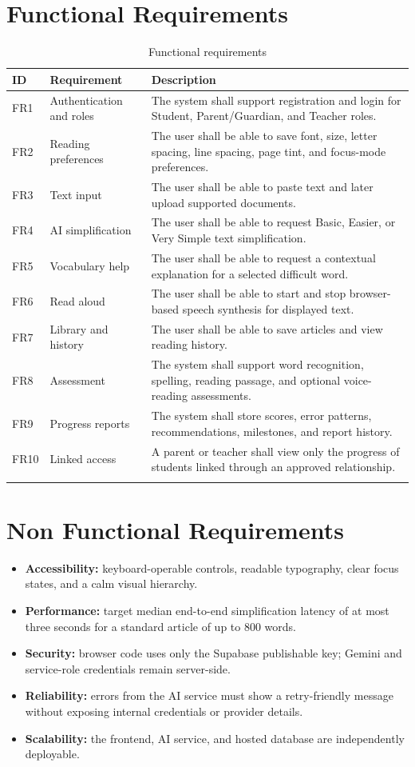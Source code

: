 \documentclass[a4paper]{tietreport}
\newcommand{\term}[1]{\textbf{#1}}
\begin{document}
\section{Functional Requirements}
\begin{longtable}{p{} p{} p{}}
\toprule
\textbf{ID} & \textbf{Requirement} & \textbf{Description} \\
\midrule
FR1 & Authentication and roles & The system shall support registration and login for Student, Parent/Guardian, and Teacher roles. \\
FR2 & Reading preferences & The user shall be able to save font, size, letter spacing, line spacing, page tint, and focus-mode preferences. \\
FR3 & Text input & The user shall be able to paste text and later upload supported documents. \\
FR4 & AI simplification & The user shall be able to request Basic, Easier, or Very Simple text simplification. \\
FR5 & Vocabulary help & The user shall be able to request a contextual explanation for a selected difficult word. \\
FR6 & Read aloud & The user shall be able to start and stop browser-based speech synthesis for displayed text. \\
FR7 & Library and history & The user shall be able to save articles and view reading history. \\
FR8 & Assessment & The system shall support word recognition, spelling, reading passage, and optional voice-reading assessments. \\
FR9 & Progress reports & The system shall store scores, error patterns, recommendations, milestones, and report history. \\
FR10 & Linked access & A parent or teacher shall view only the progress of students linked through an approved relationship. \\
\bottomrule
\caption{Functional requirements}
\end{longtable}

\section{Non Functional Requirements}
\begin{itemize}
  \item \term{Accessibility:} keyboard-operable controls, readable typography, clear focus states, and a calm visual hierarchy.
  \item \term{Performance:} target median end-to-end simplification latency of at most three seconds for a standard article of up to 800 words.
  \item \term{Security:} browser code uses only the Supabase publishable key; Gemini and service-role credentials remain server-side.
  \item \term{Reliability:} errors from the AI service must show a retry-friendly message without exposing internal credentials or provider details.
  \item \term{Scalability:} the frontend, AI service, and hosted database are independently deployable.
\end{itemize}
\end{document}
